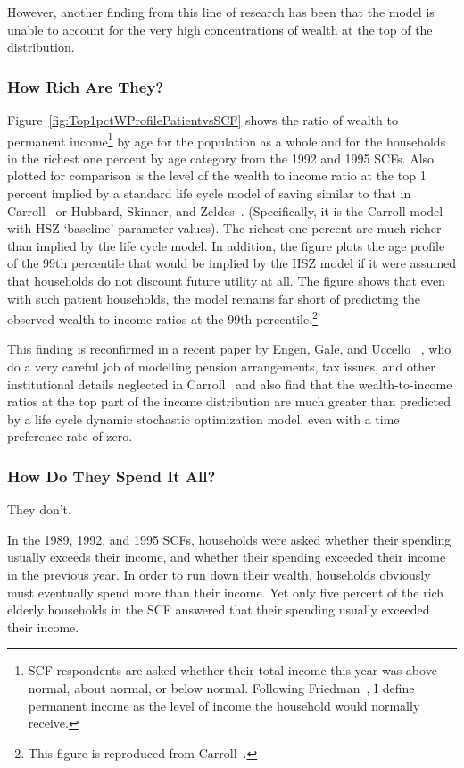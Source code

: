 \documentclass[12pt]{article}
\begin{document}
However, another finding from this line of research has been that the model
is unable to account for the very high concentrations of wealth at the top
of the distribution.

\subsubsection{How Rich Are They?}

Figure~\ref{fig:Top1pctWProfilePatientvsSCF} shows the ratio of wealth to
permanent income\footnote{%
SCF respondents are asked whether their total income this year was above
normal, about normal, or below normal. Following Friedman~\cite
{friedmanATheory}, I define permanent income as the level of income the
household would normally receive.} by age for the population as a whole and
for the households in the richest one percent by age category from the 1992
and 1995 SCFs. Also plotted for comparison is the level of the wealth to
income ratio at the top 1 percent implied by a standard life cycle model of
saving similar to that in Carroll~\cite{carroll:bslcpih} or Hubbard,
Skinner, and Zeldes~\cite{hsz:importance}. (Specifically, it is the Carroll
model with HSZ `baseline' parameter values). The richest one percent are
much richer than implied by the life cycle model. In addition, the figure
plots the age profile of the 99th percentile that would be implied by the
HSZ model if it were assumed that households do not discount future utility
at all. The figure shows that even with such patient households, the model
remains far short of predicting the observed wealth to income ratios at the
99th percentile.\footnote{%
This figure is reproduced from Carroll~\cite{carroll:richsave}.}

This finding is reconfirmed in a recent paper by Engen, Gale, and Uccello~
\cite{egu:adequacy}, who do a very careful job of modelling pension
arrangements, tax issues, and other institutional details neglected in
Carroll~\cite{carroll:richsave} and also find that the wealth-to-income
ratios at the top part of the income distribution are much greater than
predicted by a life cycle dynamic stochastic optimization model, even with a
time preference rate of zero.

\subsubsection{How Do They Spend It All?}

They don't.

In the 1989, 1992, and 1995 SCFs, households were asked whether their
spending usually exceeds their income, and whether their spending exceeded
their income in the previous year. In order to run down their wealth,
households obviously must eventually spend more than their income. Yet only
five percent of the rich elderly households in the SCF answered that their
spending usually exceeded their income.
\end{document}
